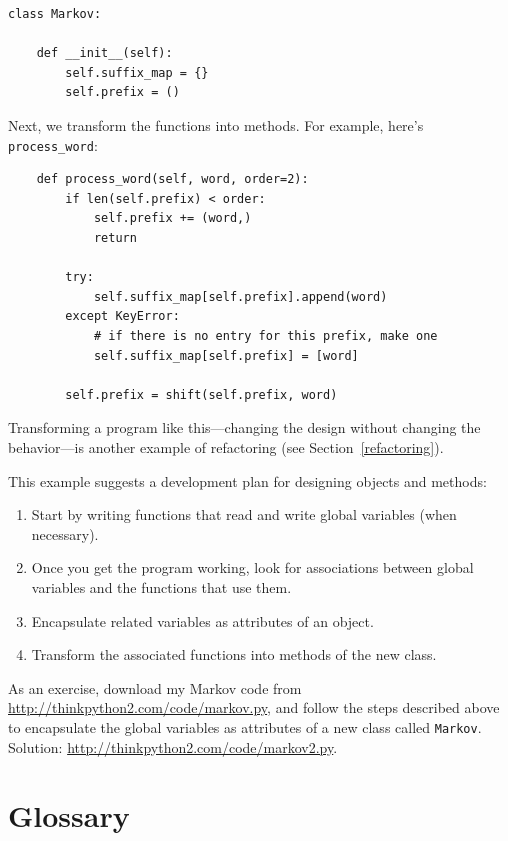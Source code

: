 \documentclass[10pt]{book}
\begin{document}
\begin{verbatim}
class Markov:

    def __init__(self):
        self.suffix_map = {}
        self.prefix = ()
\end{verbatim}

Next, we transform the functions into methods.  For example,
here's \verb"process_word":

\begin{verbatim}
    def process_word(self, word, order=2):
        if len(self.prefix) < order:
            self.prefix += (word,)
            return

        try:
            self.suffix_map[self.prefix].append(word)
        except KeyError:
            # if there is no entry for this prefix, make one
            self.suffix_map[self.prefix] = [word]

        self.prefix = shift(self.prefix, word)
\end{verbatim}

Transforming a program like this---changing the design without
changing the behavior---is another example of refactoring
(see Section~\ref{refactoring}).

This example suggests a development plan for designing objects and
methods:

\begin{enumerate}

\item Start by writing functions that read and write global
variables (when necessary).

\item Once you get the program working, look for associations
between global variables and the functions that use them.

\item Encapsulate related variables as attributes of an object.

\item Transform the associated functions into methods of the new
class.

\end{enumerate}

As an exercise, download my Markov code from
\url{http://thinkpython2.com/code/markov.py}, and follow the steps
described above to encapsulate the global variables as attributes of a
new class called {\tt Markov}.  Solution:
\url{http://thinkpython2.com/code/markov2.py}.


\section{Glossary}
\end{document}
